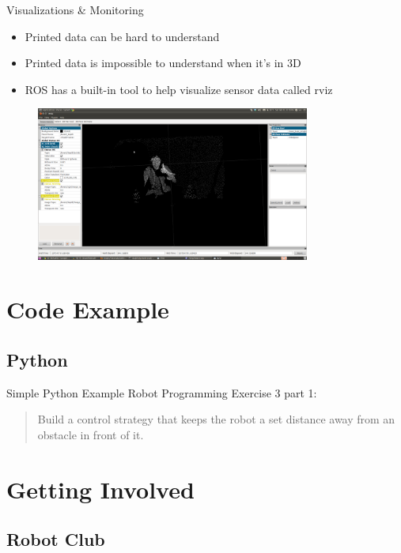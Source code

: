 \documentclass{beamer}
\begin{document}
\begin{frame}{Visualizations \& Monitoring}
  \begin{itemize}
  \item Printed data can be hard to understand \pause
  \item Printed data is impossible to understand when it's in 3D \pause
  \item ROS has a built-in tool to help visualize sensor data called rviz
  \end{itemize}

  \begin{figure}
    \includegraphics[trim = 0mm 30mm 0mm 0mm, clip, width=9cm]{rviz.png}
  \end{figure}
\end{frame}

\section{Code Example}
\subsection{Python}
\begin{frame}{Simple Python Example}
  Robot Programming Exercise 3 part 1:
  \begin{quote}
    Build a control strategy that keeps the robot a set distance
    away from an obstacle in front of it.
  \end{quote}
\end{frame}

\section{Getting Involved}
\subsection{Robot Club}
\end{document}
